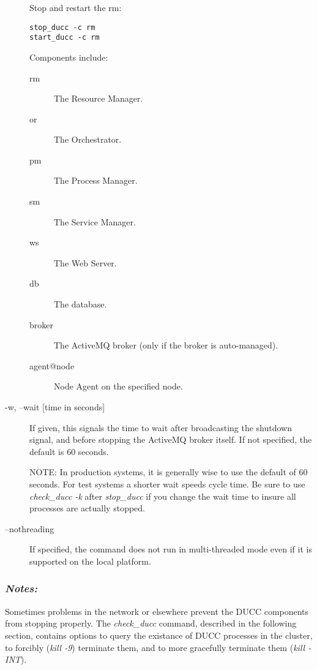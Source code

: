 \begin{description}
            Stop and restart the rm: 
\begin{verbatim}
stop_ducc -c rm 
start_ducc -c rm
\end{verbatim}
            
            Components include: 
            \begin{description}
              \item[rm] The Resource Manager.                 
              \item[or] The Orchestrator.                 
              \item[pm] The Process Manager.                 
              \item[sm] The Service Manager.                 
              \item[ws] The Web Server.                 
              \item[db] The database.
              \item[broker] The ActiveMQ broker (only if the broker is auto-managed).
              \item[agent@node] Node Agent on the specified node.
              \end{description}

          \item[-w, --wait {[time in seconds]}] If given, this signals the time to wait
            after broadcasting the shutdown signal, and before stopping the ActiveMQ broker itself.
            If not specified, the default is 60 seconds.  

            NOTE: In production systems, it is generally wise to use the default of 60 seconds.  For
            test systems a shorter wait speeds cycle time.  Be sure to use {\em check\_ducc -k} after
            {\em stop\_ducc} if you change the wait time to insure all processes are actually stopped.

          \item[--nothreading] If specified, the command does not run in multi-threaded mode
            even if it is supported on the local platform.
              
       \end{description}
            
   \subsubsection{{\em Notes:}}
   Sometimes problems in the network or elsewhere prevent the DUCC components from stopping properly.  The
   {\em check\_ducc} command, described in the following section, contains options to query the
   existance of DUCC processes in the cluster, to forcibly ({\em kill -9}) terminate them, and to
   more gracefully terminate them ({\em kill -INT}).
          



